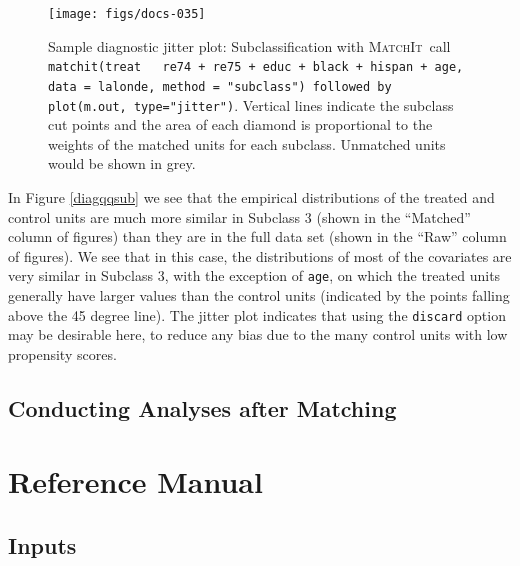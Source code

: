 \documentclass[oneside,letterpaper,titlepage]{article}
\newcommand{\MatchIt}{\textsc{MatchIt}}
\begin{document}
\begin{figure}[tbp]
  \begin{center}
\texttt{[image: figs/docs-035]}
    \hfill
    \caption{Sample diagnostic jitter plot: Subclassification with
      \MatchIt\ call \texttt{matchit(treat ~ re74 + re75 + educ +
        black + hispan + age, data = lalonde, method = "subclass")
        followed by plot(m.out, type="jitter")}.  Vertical lines
      indicate the subclass cut points and the area of each diamond is
      proportional to the weights of the matched units for each
      subclass.  Unmatched units would be shown in grey.}
    \label{diagjittersub}
  \end{center}
\end{figure}

In Figure \ref{diagqqsub} we see that the empirical distributions of
the treated and control units are much more similar in Subclass 3
(shown in the ``Matched'' column of figures) than they are in the full
data set (shown in the ``Raw'' column of figures).  We see that in
this case, the distributions of most of the covariates are very
similar in Subclass 3, with the exception of \texttt{age}, on
which the treated units generally have larger values than the control
units (indicated by the points falling above the 45 degree line).  The
jitter plot indicates that using the \texttt{discard} option may be
desirable here, to reduce any bias due to the many control units with
low propensity scores.


\subsection{Conducting Analyses after Matching}
\label{subsec:analysis}




\section{Reference Manual}
\label{sec:reference}

\subsection{Inputs}
\label{subsec:inputs}


\end{document}
